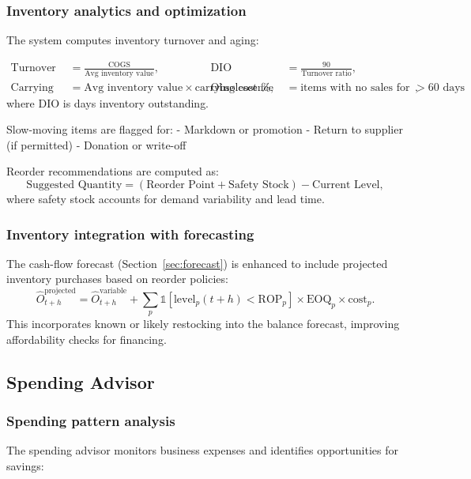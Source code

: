 \documentclass[10pt,a4paper]{article}
\begin{document}
\subsubsection{Inventory analytics and optimization}

The system computes inventory turnover and aging:

\begin{align*}
\text{Turnover ratio} &= \frac{\text{COGS}}{\text{Avg inventory value}}, &
\text{DIO} &= \frac{90}{\text{Turnover ratio}},\\
\text{Carrying cost} &= \text{Avg inventory value} \times \text{carrying cost \%}, &
\text{Obsolescence risk} &= \text{items with no sales for $>60$ days},
\end{align*}
where DIO is days inventory outstanding.

Slow-moving items are flagged for:
- Markdown or promotion
- Return to supplier (if permitted)
- Donation or write-off

Reorder recommendations are computed as:
\[
\text{Suggested Quantity} = (\text{Reorder Point} + \text{Safety Stock}) - \text{Current Level},
\]
where safety stock accounts for demand variability and lead time.

\subsubsection{Inventory integration with forecasting}

The cash-flow forecast (Section~\ref{sec:forecast}) is enhanced to include projected inventory purchases based on reorder policies:
\[
\hat O^{\text{projected}}_{t+h} = \hat O^{\text{variable}}_{t+h} + \sum_{p} \mathbb{1}[\text{level}_p(t+h) < \text{ROP}_p] \times \text{EOQ}_p \times \text{cost}_p.
\]
This incorporates known or likely restocking into the balance forecast, improving affordability checks for financing.

\subsection{Spending Advisor}

\subsubsection{Spending pattern analysis}

The spending advisor monitors business expenses and identifies opportunities for savings:
\end{document}
